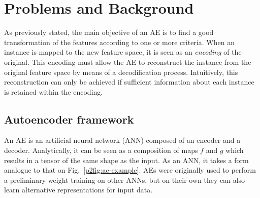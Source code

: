 
\section{Problems and Background}
\label{p2sec.background}


As previously stated, the main objective of an AE is to find a good transformation of the features according to one or more criteria. When an instance is mapped to the new feature space, it is seen as an \emph{encoding} of the original. This encoding must allow the AE to reconstruct the instance from the original feature space by means of a decodification process. Intuitively, this reconstruction can only be achieved if sufficient information about each instance is retained within the encoding.

\subsection{Autoencoder framework}

An AE  is an artificial neural network (ANN) composed of an encoder and a decoder. Analytically, it can be seen as a composition of maps $f$ and $g$ which results in a tensor of the same shape as the input. As an ANN, it takes a form analogue to that on Fig.~\ref{p2fig:ae-example}. AEs were originally used to perform a preliminary weight training on other ANNs, but on their own they can also learn alternative representations for input data.

